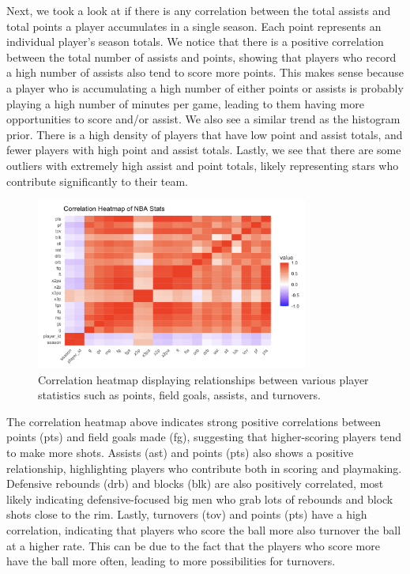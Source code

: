 \documentclass[12pt]{article}
\begin{document}
Next, we took a look at if there is any correlation between the total assists and total points a player accumulates in a single season. Each point represents an individual player’s season totals. We notice that there is a positive correlation between the total number of assists and points, showing that players who record a high number of assists also tend to score more points. This makes sense because a player who is accumulating a high number of either points or assists is probably playing a high number of minutes per game, leading to them having more opportunities to score and/or assist. We also see a similar trend as the histogram prior. There is a high density of players that have low point and assist totals, and fewer players with high point and assist totals. Lastly, we see that there are some outliers with extremely high assist and point totals, likely representing stars who contribute significantly to their team.

\begin{figure}[H]
    \centering
    \includegraphics[width=0.8\textwidth]{EDA_HEATMAP.png}
    \caption{Correlation heatmap displaying relationships between various player statistics such as points, field goals, assists, and turnovers.}
    \label{fig:correlation_heatmap}
\end{figure}

The correlation heatmap above indicates strong positive correlations between points (pts) and field goals made (fg), suggesting that higher-scoring players tend to make more shots. Assists (ast) and points (pts) also shows a positive relationship, highlighting players who contribute both in scoring and playmaking. Defensive rebounds (drb) and blocks (blk) are also positively correlated, most likely indicating defensive-focused big men who grab lots of rebounds and block shots close to the rim. Lastly, turnovers (tov) and points (pts) have a high correlation, indicating that players who score the ball more also turnover the ball at a higher rate. This can be due to the fact that the players who score more have the ball more often, leading to more possibilities for turnovers. 
\end{document}
